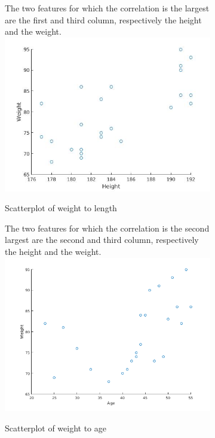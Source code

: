 \documentclass{article}
\begin{document}
\begin{figure}[H]
\centering

\begin{subfigure}[b]{.45\linewidth}
The two features for which the correlation is the largest are the first and third column, respectively the height and the weight.
\centering
\includegraphics[width=\columnwidth]{plot_1_3_a.jpg}
\caption{Scatterplot of weight to length}
\label{fig1.3a}
\end{subfigure}%
\quad
\begin{subfigure}[b]{.45\linewidth}
The two features for which the correlation is the second largest are the second and third column, respectively the height and the weight.
\centering
\includegraphics[width=\linewidth]{plot_1_3_b.png}
\caption{Scatterplot of weight to age}
\label{fig1.3b}
\end{subfigure}
\caption{}
\end{figure}
\end{document}
